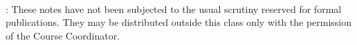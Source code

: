 \documentclass[11pt]{article}
\newcommand{\lecturenumber}{12}
\begin{document}
		\begin{center}
			\ \\
		\end{center}
		
		: {These notes have not been subjected to the
			usual scrutiny reserved for formal publications.  They may be distributed
			outside this class only with the permission of the Course Coordinator.}
		\vspace*{4mm}

        \tableofcontents
        \newpage
\end{document}
